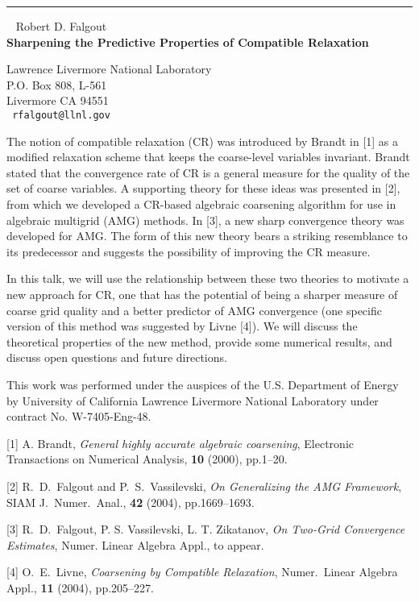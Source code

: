 \documentclass{report}
\begin{document}
\begin{center}

\rule{6in}{1pt} \
{\large
Robert D. Falgout
\\ {\bf
Sharpening the Predictive Properties of Compatible Relaxation
}}

Lawrence Livermore National Laboratory
\\
P.O. Box 808, L-561
\\
Livermore CA 94551 
\\ {\tt
rfalgout@llnl.gov
}
\end{center}

The notion of compatible relaxation (CR) was introduced by Brandt in
[1] as a modified relaxation scheme that keeps the coarse-level
variables invariant. Brandt stated that the convergence rate of CR is a
general measure for the quality of the set of coarse variables. A
supporting theory for these ideas was presented in [2], from which we
developed a CR-based algebraic coarsening algorithm for use in
algebraic multigrid (AMG) methods. In [3], a new sharp convergence
theory was developed for AMG. The form of this new theory bears a
striking resemblance to its predecessor and suggests the possibility of
improving the CR measure.

In this talk, we will use the relationship between these two theories
to motivate a new approach for CR, one that has the potential of being
a sharper measure of coarse grid quality and a better predictor of AMG
convergence (one specific version of this method was suggested by Livne
[4]). We will discuss the theoretical properties of the new method,
provide some numerical results, and discuss open questions and future
directions.

This work was performed under the auspices of the U.S. Department of
Energy by University of California Lawrence Livermore National
Laboratory under contract No. W-7405-Eng-48.

[1] A. Brandt,
{\em General highly accurate algebraic coarsening}, Electronic
Transactions on Numerical Analysis, {\bf 10} (2000), pp.1--20.

[2] R.~D.~Falgout and P.~S.~Vassilevski, {\em On Generalizing the AMG
Framework}, SIAM J.~Numer.~Anal., {\bf 42} (2004), pp.1669--1693.

[3] R.~D.~Falgout, P. S. Vassilevski, L. T. Zikatanov,
{\em On Two-Grid Convergence Estimates},
Numer. Linear Algebra Appl., to appear.

[4] O.~E.~Livne,
{\em Coarsening by Compatible Relaxation},
Numer.~Linear Algebra Appl., {\bf 11} (2004), pp.205--227. 
\end{document}
